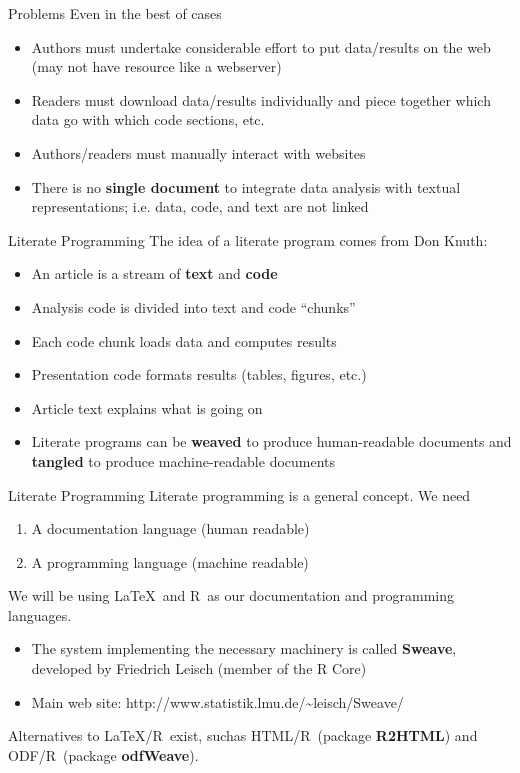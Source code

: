 \documentclass{beamer}
\newcommand{\R}{\textsf{R}}
\begin{document}
\begin{frame}{Problems}
  Even in the best of cases
  \begin{itemize}
  \item Authors must undertake considerable effort to put data/results
    on the web (may not have resource like a webserver)
  \item Readers must download data/results individually and piece together which data go with which code sections, etc.
  \item Authors/readers must manually interact with websites
  \item There is no \textbf{single document} to integrate data
    analysis with textual representations; i.e. data, code, and text
    are not linked
  \end{itemize}
\end{frame}

\begin{frame}{Literate Programming}
  The idea of a literate program comes from Don Knuth:
\begin{itemize}
\item An article is a stream of \textbf{text} and \textbf{code}
\item Analysis code is divided into text and code ``chunks''
\item Each code chunk loads data and computes results
\item Presentation code formats results (tables, figures, etc.)
\item Article text explains what is going on
\item Literate programs can be \textbf{weaved} to produce
  human-readable documents and \textbf{tangled} to produce
  machine-readable documents
  \end{itemize}
\end{frame}

\begin{frame}{Literate Programming}
Literate programming is a general concept. We need
\begin{enumerate}
\item A documentation language (human readable)
\item A programming language (machine readable)
\end{enumerate}
We will be using \LaTeX\ and \R\ as our documentation and programming
languages.
\begin{itemize}
\item The system implementing the necessary machinery is called
\textbf{Sweave}, developed by Friedrich Leisch (member of the R Core)
\item Main web site: http://www.statistik.lmu.de/\~{}leisch/Sweave/
\end{itemize}
Alternatives to \LaTeX/\R\ exist, suchas HTML/\R\ (package
\textbf{R2HTML}) and ODF/\R\ (package \textbf{odfWeave}).
\end{frame}
\end{document}
